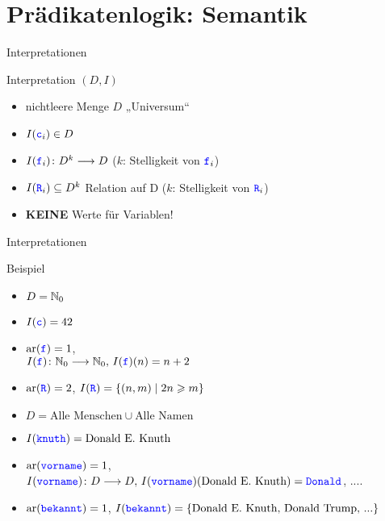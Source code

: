 
\section{Prädikatenlogik: Semantik}

\begin{frame}{Interpretationen}
	\begin{block}{Interpretation $(D,I)$}
		\begin{itemize}
			\item nichtleere Menge $D$ \quad „Universum“
			\item $I(\hbox{\textcolor{blue}{\texttt{c}}}_i) \in D$
			\item $I(\hbox{\textcolor{blue}{\texttt{f}}}_i) \colon D^k \longrightarrow D$ \quad ($k$: Stelligkeit von $\hbox{\textcolor{blue}{\texttt{f}}}_i$)
			\item $I(\hbox{\textcolor{blue}{\texttt{R}}}_i) \subseteq D^k$ \; Relation auf D \quad ($k$: Stelligkeit von $\hbox{\textcolor{blue}{\texttt{R}}}_i$)
			\item \textbf{KEINE} Werte für Variablen!
		\end{itemize}
    \end{block}
\end{frame}
\begin{frame}{Interpretationen}
    \begin{exampleblock}{Beispiel}
        \begin{itemize}
            \item $D = \mathbb{N}_0$
            \item $I(\hbox{\textcolor{blue}{\texttt{c}}}) = 42$
            \item $\mathrm{ar}(\hbox{\textcolor{blue}{\texttt{f}}}) = 1$, \\ $I(\hbox{\textcolor{blue}{\texttt{f}}}) \colon \mathbb{N}_0 \longrightarrow \mathbb{N}_0, \, I(\hbox{\textcolor{blue}{\texttt{f}}})(n) = n+2$
            \item $\mathrm{ar}(\hbox{\textcolor{blue}{\texttt{R}}}) = 2$, \; $I(\hbox{\textcolor{blue}{\texttt{R}}}) = \left\{(n, m) \;\middle|\; 2n \geqslant m \right\}$ 
        \end{itemize}
        \pause
        \begin{itemize}
            \item $D = \text{Alle Menschen} \cup \text{Alle Namen}$
            \item $I(\hbox{\textcolor{blue}{\texttt{knuth}}}) = \text{Donald E. Knuth}$
            \item $\mathrm{ar}(\hbox{\textcolor{blue}{\texttt{vorname}}}) = 1$, \\ $I(\hbox{\textcolor{blue}{\texttt{vorname}}}) \colon D \longrightarrow D, \, I(\hbox{\textcolor{blue}{\texttt{vorname}}})(\text{Donald E. Knuth}) = \hbox{\textcolor{blue}{\texttt{Donald}}}$, ....
            \item $\mathrm{ar}(\hbox{\textcolor{blue}{\texttt{bekannt}}}) = 1$, \; $I(\hbox{\textcolor{blue}{\texttt{bekannt}}}) = \left\{\text{Donald E. Knuth, Donald Trump, ...}\right\}$
        \end{itemize}
	\end{exampleblock}
\end{frame}

